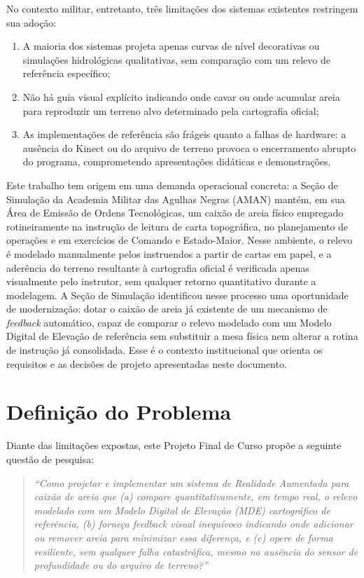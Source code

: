 No contexto militar, entretanto,
três limitações dos sistemas existentes restringem sua adoção:

\begin{enumerate}
    \item A maioria dos sistemas projeta apenas curvas de nível
          decorativas ou simulações hidrológicas qualitativas, sem
          comparação com um relevo de referência específico;
    \item Não há guia visual explícito indicando onde
          cavar ou onde acumular areia para reproduzir um terreno
          alvo determinado pela cartografia oficial;
    \item As implementações de referência são frágeis quanto a
          falhas de hardware: a ausência do Kinect ou do arquivo de
          terreno provoca o encerramento abrupto do programa,
          comprometendo apresentações didáticas e demonstrações.
\end{enumerate}

Este trabalho tem origem em uma demanda operacional concreta: a
Seção de Simulação da Academia Militar das Agulhas Negras (AMAN)
mantém, em sua Área de Emissão de Ordens Tecnológicas, um caixão
de areia físico empregado rotineiramente na instrução de leitura de carta
topográfica, no planejamento de operações e em exercícios de Comando e
Estado-Maior. Nesse ambiente, o relevo é modelado manualmente pelos
instruendos a partir de cartas em papel, e a aderência do terreno
resultante à cartografia oficial é verificada apenas visualmente pelo
instrutor, sem qualquer retorno quantitativo durante a modelagem. A
Seção de Simulação identificou nesse processo uma oportunidade de
modernização: dotar o caixão de areia já existente de um mecanismo de
\emph{feedback} automático, capaz de comparar o relevo modelado com um
Modelo Digital de Elevação de referência sem substituir a mesa física
nem alterar a rotina de instrução já consolidada. Esse é o contexto
institucional que orienta os requisitos e as decisões de projeto
apresentadas neste documento.

\section{Definição do Problema}
\label{sec:problema}

Diante das limitações expostas, este Projeto Final de Curso propõe a
seguinte questão de pesquisa:

\begin{quote}
\itshape
``Como projetar e implementar um sistema de Realidade Aumentada para
caixão de areia que (a) compare quantitativamente, em tempo real, o relevo
modelado com um Modelo Digital de Elevação (MDE) cartográfico de
referência, (b) forneça \emph{feedback} visual inequívoco indicando onde
adicionar ou remover areia para minimizar essa diferença, e (c) opere de
forma resiliente, sem qualquer falha catastrófica, mesmo na ausência do
sensor de profundidade ou do arquivo de terreno?''
\end{quote}


